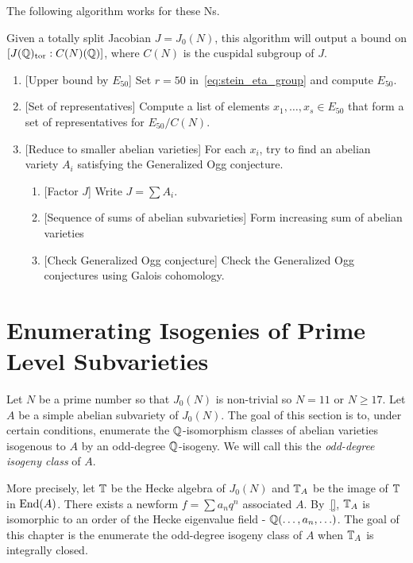 \documentclass[11pt, proquest]{uwthesis}
\begin{document}
The following algorithm works for these Ns.
\begin{algorithm}
    Given a totally split Jacobian $J=J_0(N)$, this algorithm will output a
    bound on $[J(\mathbb{Q})_{\mathrm{tor}}:C(N)(\mathbb{Q})]$, where $C(N)$ is the cuspidal subgroup
    of $J$.
    \begin{enumerate}
        \item{} [Upper bound by $E_{50}$]
            Set $r=50$ in~\eqref{eq:stein_eta_group} and compute $E_{50}$.
        \item{} [Set of representatives]
            Compute a list of elements $x_1,\ldots,x_s\in E_{50}$ that form a
            set of representatives for $E_{50}/C(N)$.
        \item{} [Reduce to smaller abelian varieties]
            For each $x_i$, try to find an abelian variety $A_i$ satisfying the
            Generalized Ogg conjecture.
            \begin{enumerate}
                \item{} [Factor $J$]
                    Write $J=\sum A_i$.
                \item{} [Sequence of sums of abelian subvarieties]
                    Form increasing sum of abelian varieties
                \item{} [Check Generalized Ogg conjecture]
                    Check the Generalized Ogg conjectures using Galois
                    cohomology.
            \end{enumerate}
    \end{enumerate}
\end{algorithm}



\chapter{Enumerating Isogenies of Prime Level Subvarieties}%
\label{chap:isogeny_class}

Let $N$ be a prime number so that $J_0(N)$ is non-trivial so $N=11$ or $N\geq
17$. Let $A$ be a simple abelian subvariety of $J_0(N)$. The goal of this
section is to, under certain conditions, enumerate the $\mathbb{Q}$-isomorphism
classes of abelian varieties isogenous to $A$ by an odd-degree $\mathbb{Q}$-isogeny.
We will call this the \emph{odd-degree isogeny class} of $A$. 

More precisely, let $\mathbb{T}$ be the Hecke algebra of $J_0(N)$ and $\mathbb{T}_A$ be the
image of $\mathbb{T}$ in $\operatorname{End}(A)$. There exists a newform $f=\sum a_n q^n$ associated
$A$. By~\ref{}, $\mathbb{T}_A$ is isomorphic to an order of the Hecke eigenvalue field
- $\mathbb{Q}(\ldots,a_n,\ldots)$. The goal of this chapter is the enumerate the
odd-degree isogeny class of $A$ when $\mathbb{T}_A$ is integrally closed.
\end{document}
